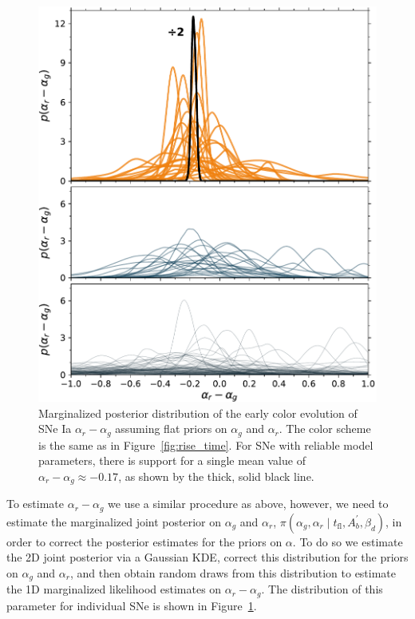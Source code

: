 \documentclass[twocolumn]{./aastex63}
\begin{document}
\begin{figure}
    \centering
    \includegraphics[width=1\linewidth]{./figures/delta.pdf}
    \caption{Marginalized posterior distribution of the early color evolution of
    SNe Ia $\alpha_r - \alpha_g$ assuming flat priors on $\alpha_g$ and
    $\alpha_r$. The color scheme is the same as in Figure~\ref{fig:rise_time}.
    For SNe with reliable model parameters, there is support for a single mean
    value of $\alpha_r - \alpha_g \approx -0.17$, as shown by the thick, solid
    black line.}
    \label{fig:delta}
\end{figure}

To estimate $\alpha_r - \alpha_g$ we use a similar procedure as above, however,
we need to estimate the marginalized joint posterior on $\alpha_g$ and
$\alpha_r$, $\pi(\alpha_g,\alpha_r \mid t_\mathrm{fl}, A^\prime_b, \beta_d)$, in
order to correct the posterior estimates for the priors on $\alpha$. To do so we
estimate the 2D joint posterior via a Gaussian KDE, correct this distribution
for the priors on $\alpha_g$ and $\alpha_r$, and then obtain random draws from
this distribution to estimate the 1D marginalized likelihood estimates on
$\alpha_r - \alpha_g$. The distribution of this parameter for individual SNe is
shown in Figure~\ref{fig:delta}.
\end{document}
